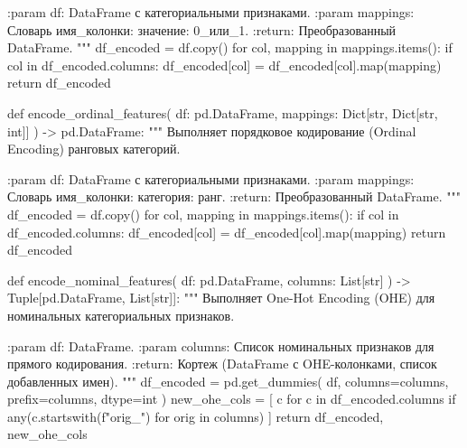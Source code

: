 \documentclass[14pt,a4paper]{extarticle}
\begin{document}
\begin{CodeListing}
    :param df: DataFrame с категориальными признаками.
    :param mappings: Словарь {имя_колонки: {значение: 0_или_1}}.
    :return: Преобразованный DataFrame.
    """
    df_encoded = df.copy()
    for col, mapping in mappings.items():
        if col in df_encoded.columns:
            df_encoded[col] = df_encoded[col].map(mapping)
    return df_encoded


def encode_ordinal_features(
    df: pd.DataFrame,
    mappings: Dict[str, Dict[str, int]]
) -> pd.DataFrame:
    """
    Выполняет порядковое кодирование (Ordinal Encoding) ранговых категорий.

    :param df: DataFrame с категориальными признаками.
    :param mappings: Словарь {имя_колонки: {категория: ранг}}.
    :return: Преобразованный DataFrame.
    """
    df_encoded = df.copy()
    for col, mapping in mappings.items():
        if col in df_encoded.columns:
            df_encoded[col] = df_encoded[col].map(mapping)
    return df_encoded


def encode_nominal_features(
    df: pd.DataFrame,
    columns: List[str]
) -> Tuple[pd.DataFrame, List[str]]:
    """
    Выполняет One-Hot Encoding (OHE) для номинальных категориальных признаков.

    :param df: DataFrame.
    :param columns: Список номинальных признаков для прямого кодирования.
    :return: Кортеж (DataFrame с OHE-колонками, список добавленных имен).
    """
    df_encoded = pd.get_dummies(
        df, columns=columns, prefix=columns, dtype=int
    )
    new_ohe_cols = [
        c for c in df_encoded.columns
        if any(c.startswith(f"{orig}_") for orig in columns)
    ]
    return df_encoded, new_ohe_cols\end{CodeListing}

\clearpage
\end{document}

